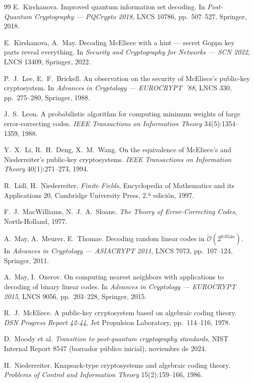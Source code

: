 \begin{thebibliography}{99}
E.~Kirshanova. Improved quantum information set decoding. In
\emph{Post-Quantum Cryptography --- PQCrypto 2018}, LNCS 10786,
pp.~507--527, Springer, 2018.

E.~Kirshanova, A.~May. Decoding McEliece with a hint --- secret
Goppa key parts reveal everything. In \emph{Security and Cryptography
for Networks --- SCN 2022}, LNCS 13409, Springer, 2022.

P.~J.~Lee, E.~F.~Brickell. An observation on the security of
McEliece's public-key cryptosystem. In \emph{Advances in Cryptology
--- EUROCRYPT~'88}, LNCS 330, pp.~275--280, Springer, 1988.

J.~S.~Leon. A probabilistic algorithm for computing minimum weights
of large error-correcting codes. \emph{IEEE Transactions on
Information Theory} 34(5):1354--1359, 1988.

Y.~X.~Li, R.~H.~Deng, X.~M.~Wang. On the equivalence of McEliece's
and Niederreiter's public-key cryptosystems. \emph{IEEE Transactions
on Information Theory} 40(1):271--273, 1994.

R.~Lidl, H.~Niederreiter. \emph{Finite Fields}, Encyclopedia of
Mathematics and its Applications 20, Cambridge University Press,
2.ª edici\'on, 1997.

F.~J.~MacWilliams, N.~J.~A.~Sloane. \emph{The Theory of
Error-Correcting Codes}, North-Holland, 1977.

A.~May, A.~Meurer, E.~Thomae. Decoding random linear codes in
$\tilde{\mathcal{O}}(2^{0.054n})$. In \emph{Advances in Cryptology ---
ASIACRYPT 2011}, LNCS 7073, pp.~107--124, Springer, 2011.

A.~May, I.~Ozerov. On computing nearest neighbors with applications
to decoding of binary linear codes. In \emph{Advances in Cryptology
--- EUROCRYPT 2015}, LNCS 9056, pp.~203--228, Springer, 2015.

R.~J.~McEliece. A public-key cryptosystem based on algebraic coding
theory. \emph{DSN Progress Report 42-44}, Jet Propulsion Laboratory,
pp.~114--116, 1978.

D.~Moody et al. \emph{Transition to post-quantum cryptography
standards}, NIST Internal Report 8547 (borrador p\'ublico inicial),
noviembre de 2024.

H.~Niederreiter. Knapsack-type cryptosystems and algebraic coding
theory. \emph{Problems of Control and Information Theory}
15(2):159--166, 1986.


\end{thebibliography}
